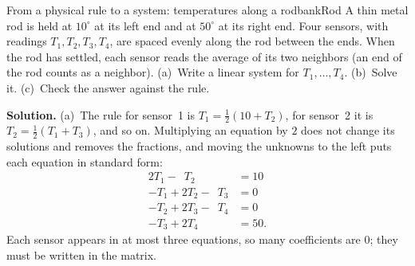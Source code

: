 \documentclass[11pt]{article}
\begin{document}
\begin{exmp}{From a physical rule to a system: temperatures along a rod}{bankRod}
A thin metal rod is held at $10^\circ$ at its left end and at $50^\circ$ at its right end. Four sensors, with readings $T_1,T_2,T_3,T_4$, are spaced evenly along the rod between the ends. When the rod has settled, each sensor reads the average of its two neighbors (an end of the rod counts as a neighbor). (a)~Write a linear system for $T_1,\dots,T_4$. (b)~Solve it. (c)~Check the answer against the rule.

\textbf{Solution.} (a)~The rule for sensor~1 is $T_1=\tfrac12(10+T_2)$, for sensor~2 it is $T_2=\tfrac12(T_1+T_3)$, and so on. Multiplying an equation by $2$ does not change its solutions and removes the fractions, and moving the unknowns to the left puts each equation in standard form:
\[
\begin{aligned}
2T_1-\phantom{2}T_2&=10\\
-T_1+2T_2-\phantom{2}T_3&=0\\
-T_2+2T_3-\phantom{2}T_4&=0\\
-T_3+2T_4&=50.
\end{aligned}
\]
Each sensor appears in at most three equations, so many coefficients are $0$; they must be written in the matrix.


\end{exmp}
\end{document}
